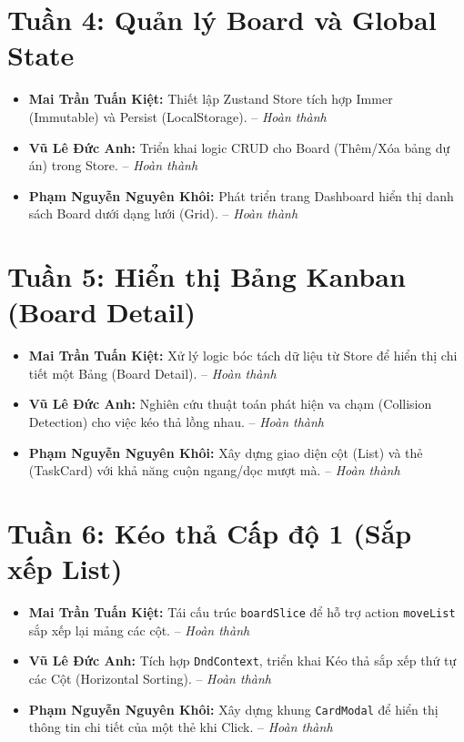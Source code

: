\section*{Tuần 4: Quản lý Board và Global State}
\begin{itemize}
    \item \textbf{Mai Trần Tuấn Kiệt:} Thiết lập Zustand Store tích hợp Immer (Immutable) và Persist (LocalStorage). -- \textit{Hoàn thành}
    \item \textbf{Vũ Lê Đức Anh:} Triển khai logic CRUD cho Board (Thêm/Xóa bảng dự án) trong Store. -- \textit{Hoàn thành}
    \item \textbf{Phạm Nguyễn Nguyên Khôi:} Phát triển trang Dashboard hiển thị danh sách Board dưới dạng lưới (Grid). -- \textit{Hoàn thành}
\end{itemize}

\section*{Tuần 5: Hiển thị Bảng Kanban (Board Detail)}
\begin{itemize}
    \item \textbf{Mai Trần Tuấn Kiệt:} Xử lý logic bóc tách dữ liệu từ Store để hiển thị chi tiết một Bảng (Board Detail). -- \textit{Hoàn thành}
    \item \textbf{Vũ Lê Đức Anh:} Nghiên cứu thuật toán phát hiện va chạm (Collision Detection) cho việc kéo thả lồng nhau. -- \textit{Hoàn thành}
    \item \textbf{Phạm Nguyễn Nguyên Khôi:} Xây dựng giao diện cột (List) và thẻ (TaskCard) với khả năng cuộn ngang/dọc mượt mà. -- \textit{Hoàn thành}
\end{itemize}

\section*{Tuần 6: Kéo thả Cấp độ 1 (Sắp xếp List)}
\begin{itemize}
    \item \textbf{Mai Trần Tuấn Kiệt:} Tái cấu trúc \texttt{boardSlice} để hỗ trợ action \texttt{moveList} sắp xếp lại mảng các cột. -- \textit{Hoàn thành}
    \item \textbf{Vũ Lê Đức Anh:} Tích hợp \texttt{DndContext}, triển khai Kéo thả sắp xếp thứ tự các Cột (Horizontal Sorting). -- \textit{Hoàn thành}
    \item \textbf{Phạm Nguyễn Nguyên Khôi:} Xây dựng khung \texttt{CardModal} để hiển thị thông tin chi tiết của một thẻ khi Click. -- \textit{Hoàn thành}
\end{itemize}

